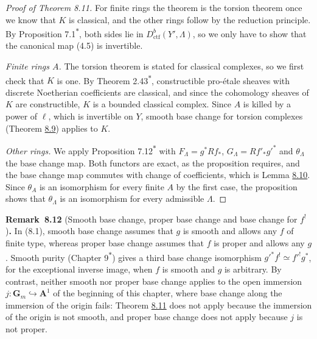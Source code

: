 \documentclass[11pt]{article}
\newenvironment{bpstatement}[2]{\par\addvspace{0.6\baselineskip}\noindent\textbf{#1}#2\textbf{.}\enspace\ignorespaces}
  {\par\addvspace{0.4\baselineskip}}
\newcommand{\bpout}[1]{#1\textsuperscript{\hyperlink{bp-outside}{\ensuremath{\ast}}}}
\begin{document}
\begin{proof}[{Proof of Theorem 8.11}]\label{bp47}%
For finite rings the theorem is the torsion theorem once we know that \(K\) is classical, and the other rings follow by the reduction principle. By Proposition \bpout{7.1}, both sides lie in \(D^b_{\mathrm{ctf}}(Y',\Lambda)\), so we only have to show that the canonical map (4.5) is invertible.

\emph{Finite rings \(A\).} The torsion theorem is stated for classical complexes, so we first check that \(K\) is one. By Theorem \bpout{2.43}, constructible pro-étale sheaves with discrete Noetherian coefficients are classical, and since the cohomology sheaves of \(K\) are constructible, \(K\) is a bounded classical complex. Since \(A\) is killed by a power of \(\ell\), which is invertible on \(Y\), smooth base change for torsion complexes (Theorem \hyperref[bp38]{8.9}) applies to \(K\).

\emph{Other rings.} We apply Proposition \bpout{7.12} with \(F_\Lambda=g^*Rf_*\), \(G_\Lambda=Rf'_*g'^*\) and \(\theta_\Lambda\) the base change map. Both functors are exact, as the proposition requires, and the base change map commutes with change of coefficients, which is Lemma \hyperref[bp43]{8.10}. Since \(\theta_A\) is an isomorphism for every finite \(A\) by the first case, the proposition shows that \(\theta_\Lambda\) is an isomorphism for every admissible \(\Lambda\).
\end{proof}

\label{bp48}%
\begin{bpstatement}{Remark~8.12}{ (Smooth base change, proper base change and base change for $f^!$)}
In (8.1), smooth base change assumes that \(g\) is smooth and allows any \(f\) of finite type, whereas proper base change assumes that \(f\) is proper and allows any \(g\). Smooth purity (Chapter \bpout{9}) gives a third base change isomorphism \(g'^*f^!\simeq f'^!g^*\), for the exceptional inverse image, when \(f\) is smooth and \(g\) is arbitrary. By contrast, neither smooth nor proper base change applies to the open immersion \(j:\mathbf G_m\hookrightarrow\mathbf A^1\) of the beginning of this chapter, where base change along the immersion of the origin fails: Theorem \hyperref[bp45]{8.11} does not apply because the immersion of the origin is not smooth, and proper base change does not apply because \(j\) is not proper.
\end{bpstatement}
\end{document}
